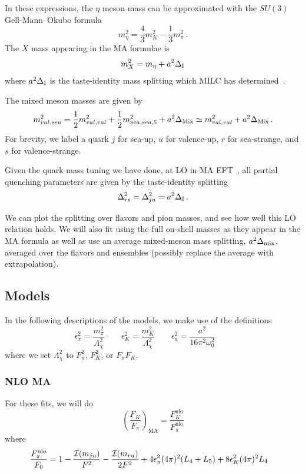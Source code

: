 \documentclass[prd,tightenlines,preprintnumbers,showpacs,superscriptaddress,notitlepage,eqsecnum,floatfix,notitlepage]{revtex4-1}
\begin{document}
In these expressions, the $\eta$ meson mass can be approximated with the $SU(3)$ Gell-Mann--Okubo formula
\begin{equation}
m_\eta^2 = \frac{4}{3} m_K^2 - \frac{1}{3}m_\pi^2\, .
\end{equation}
The $X$ mass appearing in the MA formulae is
\begin{equation}
m_X^2 = m_\eta + a^2 \Delta_{\rm I}
\end{equation}
where $a^2 \Delta_{\rm I}$ is the taste-identity mass splitting which MILC has determined~\cite{Bazavov:2012xda}.

The mixed meson masses are given by
\begin{equation}
m_{val,sea}^2 = \frac{1}{2}m_{val,val}^2 + \frac{1}{2}m_{sea,sea,5}^2 + a^2 \Delta_{\rm Mix}
\simeq m_{val,val}^2 + a^2 \Delta_{\rm Mix}\, .
\end{equation}
For brevity, we label a quark $j$ for sea-up, $u$ for valence-up, $r$ for sea-strange, and $s$ for valence-strange.

Given the quark mass tuning we have done, at LO in MA EFT~\cite{Chen:2006wf}, all partial quenching parameters are given by the taste-identity splitting
\begin{equation}
\Delta_{rs}^2 = \Delta_{ju}^2 = a^2 \Delta_{\rm I}\, .
\end{equation}

We can plot the splitting over flavors and pion masses, and see how well this LO relation holds.  We will also fit using the full on-shell masses as they appear in the MA formula as well as use an average mixed-meson mass splitting, $a^2 \Delta_{\rm mix}$, averaged over the flavors and ensembles (possibly replace the average with extrapolation).





\subsection{Models}
In the following descriptions of the models, we make use of the definitions
\begin{equation}
\epsilon_\pi^2 = \frac{m_\pi^2}{\Lambda_\chi^2} \qquad
\epsilon_K^2 = \frac{m_K^2}{\Lambda_\chi^2} \qquad
\epsilon_a^2 = \frac{a^2}{16 \pi ^2\omega_0^2} \qquad
\end{equation}
where we set $\Lambda_\chi^2$ to $F_\pi^2$, $F_K^2$, or $F_\pi F_K$.

\subsubsection{NLO MA}
For these fits, we will do
\begin{equation}
\left(\frac{F_K}{F_\pi}\right)_\text{MA} = \frac{F_K^\text{nlo}}{F_\pi^\text{nlo}}
\end{equation}
where
\begin{align}
\frac{F_\pi^{\rm nlo}}{F_0} &= 1
- \frac{\mathcal{I}(m_{ju})}{F^2}
-\frac{\mathcal{I}(m_{ru})}{2F^2}
+4 \epsilon_\pi^2 (4\pi)^2 (L_4 + L_5)
+8 \epsilon_K^2 (4\pi)^2 L_4
\end{align}
\end{document}
